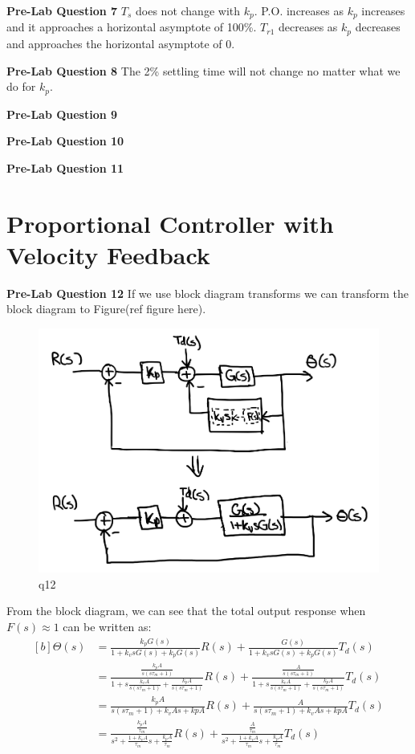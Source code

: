 \documentclass[12pt]{article}
\begin{document}
\textbf{Pre-Lab Question 7}
$T_s$ does not change with $k_p$. P.O. increases as $k_p$ increases and it approaches a horizontal asymptote of 100\%. $T_{r1}$ decreases as $k_p$ decreases and approaches the horizontal asymptote of 0.

\textbf{Pre-Lab Question 8}
The 2\% settling time will not change no matter what we do for $k_p$.

\textbf{Pre-Lab Question 9}

\textbf{Pre-Lab Question 10}

\textbf{Pre-Lab Question 11}


\setcounter{section}{5}
\section{Proportional Controller with Velocity Feedback}
\textbf{Pre-Lab Question 12}
If we use block diagram transforms we can transform the block diagram to Figure(ref figure here).
\begin{figure}
    \centering
    \includegraphics[width=\textwidth]{q12}
    \caption{\label{fig:12}q12}
\end{figure}
From the block diagram, we can see that the total output response when $F(s) \approx 1$ can be written as:
\begin{equation}
\begin{aligned}[b]
    \Theta(s) &= \frac{k_pG(s)}{1 + k_vsG(s) + k_pG(s)}R(s) + \frac{G(s)}{1 + k_vsG(s) + k_pG(s)}T_d(s) \\
    &= \frac{\frac{k_pA}{s(s\tau_m + 1)}}{1 + s\frac{k_vA}{s(s\tau_m + 1)} + \frac{k_pA}{s(s\tau_m + 1)}}R(s) + \frac{\frac{A}{s(s\tau_m + 1)}}{1 + s\frac{k_vA}{s(s\tau_m + 1)} + \frac{k_pA}{s(s\tau_m + 1)}}T_d(s) \\
    &= \frac{k_pA}{s(s\tau_m + 1) + k_vAs + kpA}R(s) + \frac{A}{s(s\tau_m + 1) + k_vAs + kpA}T_d(s) \\
    &= \frac{\frac{k_pA}{\tau_m}}{s^2 + \frac{1+k_vA}{\tau_m}s + \frac{k_pA}{\tau_m}}R(s) + \frac{\frac{A}{\tau_m}}{s^2 + \frac{1+k_vA}{\tau_m}s + \frac{k_pA}{\tau_m}}T_d(s)
\end{aligned}
\end{equation} 
\end{document}
